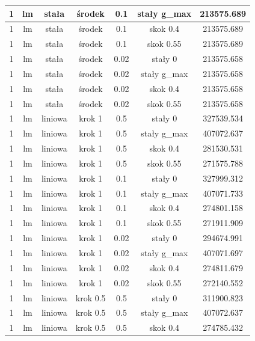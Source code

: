 \documentclass[11pt]{article}
\begin{document}
\begin{table}[h]
\begin{center}
\begin{tabular}{|c|c|c|c|c|c|c|}
      \hline
      1 & lm & stała & środek & 0.1 & stały g_max & 213575.689 \\
      \hline
      1 & lm & stała & środek & 0.1 & skok 0.4 & 213575.689 \\
      \hline
      1 & lm & stała & środek & 0.1 & skok 0.55 & 213575.689 \\
      \hline
      1 & lm & stała & środek & 0.02 & stały 0 & 213575.658 \\
      \hline
      1 & lm & stała & środek & 0.02 & stały g_max & 213575.658 \\
      \hline
      1 & lm & stała & środek & 0.02 & skok 0.4 & 213575.658 \\
      \hline
      1 & lm & stała & środek & 0.02 & skok 0.55 & 213575.658 \\
      \hline
      1 & lm & liniowa & krok 1 & 0.5 & stały 0 & 327539.534 \\
      \hline
      1 & lm & liniowa & krok 1 & 0.5 & stały g_max & 407072.637 \\
      \hline
      1 & lm & liniowa & krok 1 & 0.5 & skok 0.4 & 281530.531 \\
      \hline
      1 & lm & liniowa & krok 1 & 0.5 & skok 0.55 & 271575.788 \\
      \hline
      1 & lm & liniowa & krok 1 & 0.1 & stały 0 & 327999.312 \\
      \hline
      1 & lm & liniowa & krok 1 & 0.1 & stały g_max & 407071.733 \\
      \hline
      1 & lm & liniowa & krok 1 & 0.1 & skok 0.4 & 274801.158 \\
      \hline
      1 & lm & liniowa & krok 1 & 0.1 & skok 0.55 & 271911.909 \\
      \hline
      1 & lm & liniowa & krok 1 & 0.02 & stały 0 & 294674.991 \\
      \hline
      1 & lm & liniowa & krok 1 & 0.02 & stały g_max & 407071.697 \\
      \hline
      1 & lm & liniowa & krok 1 & 0.02 & skok 0.4 & 274811.679 \\
      \hline
      1 & lm & liniowa & krok 1 & 0.02 & skok 0.55 & 272140.552 \\
      \hline
      1 & lm & liniowa & krok 0.5 & 0.5 & stały 0 & 311900.823 \\
      \hline
      1 & lm & liniowa & krok 0.5 & 0.5 & stały g_max & 407072.637 \\
      \hline
      1 & lm & liniowa & krok 0.5 & 0.5 & skok 0.4 & 274785.432 \\

\end{tabular}
\end{center}
\end{table}
\end{document}
